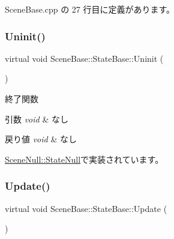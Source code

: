  Scene\+Base.\+cpp の 27 行目に定義があります。

\mbox{\label{class_scene_base_1_1_state_base_a2763fa37e45b39bd8d3bbb735c76c59b}} 
\subsubsection{\texorpdfstring{Uninit()}{Uninit()}}
{\footnotesize\ttfamily virtual void Scene\+Base\+::\+State\+Base\+::\+Uninit (\begin{DoxyParamCaption}{ }\end{DoxyParamCaption})\hspace{0.3cm}{\ttfamily [pure virtual]}}



終了関数 


\begin{DoxyParams}{引数}
{\em void} & なし \\
\hline
\end{DoxyParams}

\begin{DoxyRetVals}{戻り値}
{\em void} & なし \\
\hline
\end{DoxyRetVals}


\mbox{\hyperlink{class_scene_null_1_1_state_null_ae6b633f3f092834cea11f489bf41e548}{Scene\+Null\+::\+State\+Null}}で実装されています。

\mbox{\label{class_scene_base_1_1_state_base_ad2c6c8fd9f020eb02f64f394edee129c}} 
\subsubsection{\texorpdfstring{Update()}{Update()}}
{\footnotesize\ttfamily virtual void Scene\+Base\+::\+State\+Base\+::\+Update (\begin{DoxyParamCaption}{ }\end{DoxyParamCaption})\hspace{0.3cm}{\ttfamily [pure virtual]}}



